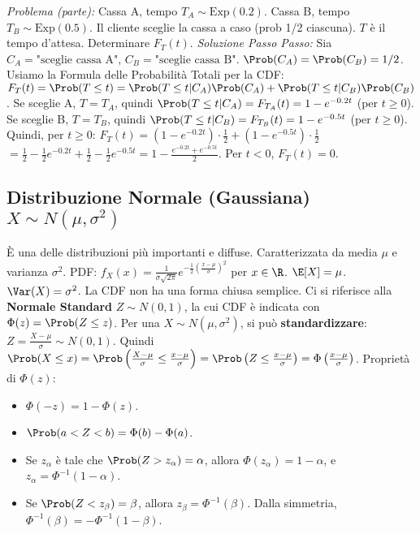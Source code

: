\begin{example}
\textit{Problema (parte):} Cassa A, tempo $T_A \sim \text{Exp}(0.2)$. Cassa B, tempo $T_B \sim \text{Exp}(0.5)$. Il cliente sceglie la cassa a caso (prob 1/2 ciascuna). $T$ è il tempo d'attesa.
Determinare $F_T(t)$.
\textit{Soluzione Passo Passo:}
Sia $C_A = \text{"sceglie cassa A"}$, $C_B = \text{"sceglie cassa B"}$. $\Prob(C_A)=\Prob(C_B)=1/2$.
Usiamo la Formula delle Probabilità Totali per la CDF:
$F_T(t) = \Prob(T \le t) = \Prob(T \le t | C_A)\Prob(C_A) + \Prob(T \le t | C_B)\Prob(C_B)$.
Se sceglie A, $T=T_A$, quindi $\Prob(T \le t | C_A) = F_{T_A}(t) = 1 - e^{-0.2t}$ (per $t \ge 0$).
Se sceglie B, $T=T_B$, quindi $\Prob(T \le t | C_B) = F_{T_B}(t) = 1 - e^{-0.5t}$ (per $t \ge 0$).
Quindi, per $t \ge 0$:
$F_T(t) = (1 - e^{-0.2t}) \cdot \frac{1}{2} + (1 - e^{-0.5t}) \cdot \frac{1}{2}$
$= \frac{1}{2} - \frac{1}{2}e^{-0.2t} + \frac{1}{2} - \frac{1}{2}e^{-0.5t} = 1 - \frac{e^{-0.2t} + e^{-0.5t}}{2}$.
Per $t < 0$, $F_T(t)=0$.
\end{example}

\subsection{Distribuzione Normale (Gaussiana) \texorpdfstring{$X \sim N(\mu, \sigma^2)$}{X ~ N(mu, sigma^2)}}
È una delle distribuzioni più importanti e diffuse. Caratterizzata da media $\mu$ e varianza $\sigma^2$.
PDF: $f_X(x) = \frac{1}{\sigma\sqrt{2\pi}} e^{-\frac{1}{2}\left(\frac{x-\mu}{\sigma}\right)^2}$ per $x \in \R$.
$\E[X] = \mu$.
$\Var(X) = \sigma^2$.
La CDF non ha una forma chiusa semplice. Ci si riferisce alla \textbf{Normale Standard} $Z \sim N(0,1)$, la cui CDF è indicata con $\Phi(z) = \Prob(Z \le z)$.
Per una $X \sim N(\mu, \sigma^2)$, si può \textbf{standardizzare}: $Z = \frac{X-\mu}{\sigma} \sim N(0,1)$.
Quindi $\Prob(X \le x) = \Prob\left(\frac{X-\mu}{\sigma} \le \frac{x-\mu}{\sigma}\right) = \Prob\left(Z \le \frac{x-\mu}{\sigma}\right) = \Phi\left(\frac{x-\mu}{\sigma}\right)$.
Proprietà di $\Phi(z)$:
\begin{itemize}
    \item $\Phi(-z) = 1 - \Phi(z)$.
    \item $\Prob(a < Z < b) = \Phi(b) - \Phi(a)$.
    \item Se $z_\alpha$ è tale che $\Prob(Z > z_\alpha) = \alpha$, allora $\Phi(z_\alpha)=1-\alpha$, e $z_\alpha = \Phi^{-1}(1-\alpha)$.
    \item Se $\Prob(Z < z_\beta) = \beta$, allora $z_\beta = \Phi^{-1}(\beta)$. Dalla simmetria, $\Phi^{-1}(\beta) = -\Phi^{-1}(1-\beta)$.
\end{itemize}

